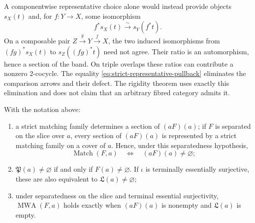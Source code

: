 A componentwise representative choice alone would instead provide objects
\(s_X(t)\) and, for \(f:Y\to X\), some isomorphism
\[
 f^*s_X(t)\xrightarrow{\sim}s_Y(f^*t).
\]
On a composable pair \(Z\xrightarrow{g}Y\xrightarrow{f}X\), the two induced
isomorphisms from \((fg)^*s_X(t)\) to \(s_Z((fg)^*t)\) need not agree.
Their ratio is an automorphism, hence a section of the band.  On triple
overlaps these ratios can contribute a nonzero \(2\)-cocycle.  The equality
\eqref{eq:strict-representative-pullback} eliminates the comparison arrows
and their defect.  The rigidity theorem uses exactly this elimination and
does not claim that an arbitrary fibred category admits it.

\begin{proposition}
\label{prop:finite-site-semantic-interface}
With the notation above:
\begin{enumerate}[label=(\roman*),nosep]
\item a strict matching family determines a section of \((aF)(a)\); if
      \(F\) is separated on the slice over \(a\), every section of
      \((aF)(a)\) is represented by a strict matching family on a cover of
      \(a\).  Hence, under this separatedness hypothesis,
      \[
      \operatorname{Match}(F,a)
      \quad\Longleftrightarrow\quad
      (aF)(a)\ne\varnothing;
      \]
\item \(\mathfrak P(a)\ne\varnothing\) if and only if \(F(a)\ne\varnothing\).
      If \(\iota\) is terminally essentially surjective, these are also
      equivalent to \(\mathfrak L(a)\ne\varnothing\);
\item under separatedness on the slice and terminal essential surjectivity,
      \(\operatorname{MWA}(F,a)\) holds exactly when \((aF)(a)\) is
      nonempty and \(\mathfrak L(a)\) is empty.
\end{enumerate}
\end{proposition}

